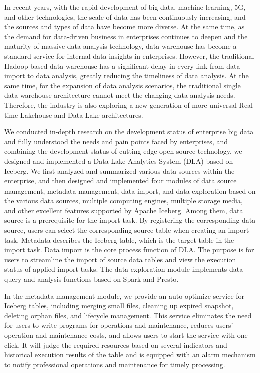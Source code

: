 \begin{abstract*}

In recent years, with the rapid development of big data, machine learning,
5G, and other technologies, the scale of data has been continuously
increasing, and the sources and types of data have become more diverse.
At the same time, as the demand for data-driven business in enterprises
continues to deepen and the maturity of massive data analysis technology,
data warehouse has become a standard service for internal data insights in
enterprises. However, the traditional Hadoop-based data warehouse has a
significant delay in every link from data import to data analysis, greatly
reducing the timeliness of data analysis. At the same time, for the expansion
of data analysis scenarios, the traditional single data warehouse architecture
cannot meet the changing data analysis needs. Therefore, the industry is also
exploring a new generation of more universal Real-time Lakehouse and Data Lake architectures.

We conducted in-depth research on the development status of enterprise big
data and fully understood the needs and pain points faced by enterprises,
and combining the development status of cutting-edge open-source technology,
we designed and implemented a Data Lake Analytics System (DLA)
based on Iceberg. We first analyzed and summarized various
data sources within the enterprise, and then designed and implemented four
modules of data source management, metadata management, data import, and data
exploration based on the various data sources, multiple computing engines,
multiple storage media, and other excellent features supported by Apache Iceberg.
Among them, data source is a prerequisite for the import task. By registering
the corresponding data source, users can select the corresponding source table
when creating an import task. Metadata describes the Iceberg table, which is the
target table in the import task. Data import is the core process function of DLA.
The purpose is for users to streamline the import of source data tables and view
the execution status of applied import tasks. The data exploration module implements
data query and analysis functions based on Spark and Presto.

In the metadata management module, we provide an auto optimize service
for Iceberg tables, including merging small files, cleaning up expired snapshot,
deleting orphan files, and lifecycle management. This service eliminates
the need for users to write programs for operations and maintenance, reduces users'
operation and maintenance costs, and allows users to start the service with one
click. It will judge the required resources based on several indicators and
historical execution results of the table and is equipped with an alarm mechanism
to notify professional operations and maintenance for timely processing.


\end{abstract*}
